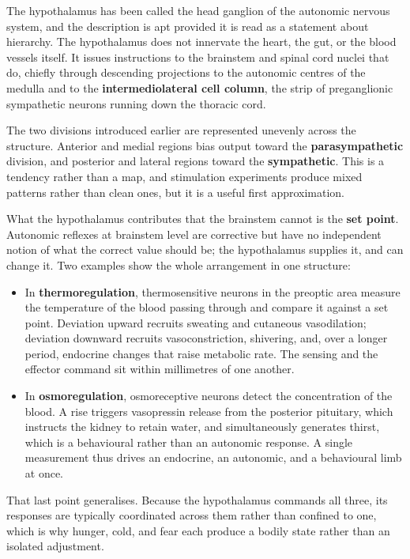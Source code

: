 \documentclass[11pt]{article}
\begin{document}
The hypothalamus has been called the head ganglion of the autonomic nervous system, and the description is apt provided it is read as a statement about hierarchy. The hypothalamus does not innervate the heart, the gut, or the blood vessels itself. It issues instructions to the brainstem and spinal cord nuclei that do, chiefly through descending projections to the autonomic centres of the medulla and to the \textbf{intermediolateral cell column}, the strip of preganglionic sympathetic neurons running down the thoracic cord.

The two divisions introduced earlier are represented unevenly across the structure. Anterior and medial regions bias output toward the \textbf{parasympathetic} division, and posterior and lateral regions toward the \textbf{sympathetic}. This is a tendency rather than a map, and stimulation experiments produce mixed patterns rather than clean ones, but it is a useful first approximation.

What the hypothalamus contributes that the brainstem cannot is the \textbf{set point}. Autonomic reflexes at brainstem level are corrective but have no independent notion of what the correct value should be; the hypothalamus supplies it, and can change it. Two examples show the whole arrangement in one structure:

\begin{itemize}
    \item In \textbf{thermoregulation}, thermosensitive neurons in the preoptic area measure the temperature of the blood passing through and compare it against a set point. Deviation upward recruits sweating and cutaneous vasodilation; deviation downward recruits vasoconstriction, shivering, and, over a longer period, endocrine changes that raise metabolic rate. The sensing and the effector command sit within millimetres of one another.
    \item In \textbf{osmoregulation}, osmoreceptive neurons detect the concentration of the blood. A rise triggers vasopressin release from the posterior pituitary, which instructs the kidney to retain water, and simultaneously generates thirst, which is a behavioural rather than an autonomic response. A single measurement thus drives an endocrine, an autonomic, and a behavioural limb at once.
\end{itemize}

That last point generalises. Because the hypothalamus commands all three, its responses are typically coordinated across them rather than confined to one, which is why hunger, cold, and fear each produce a bodily state rather than an isolated adjustment.
\end{document}
